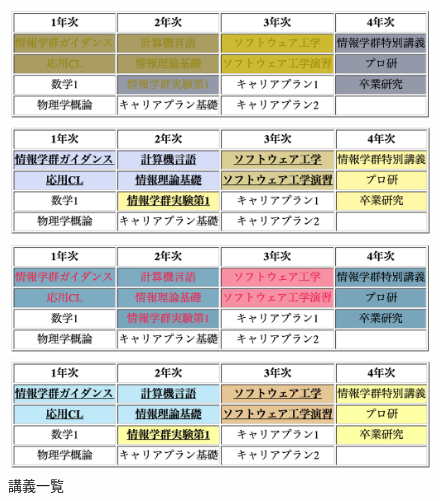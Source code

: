 \begin{figure}[H]
\begin{minipage}[b]{.49\columnwidth}
    \end{minipage}
    \begin{minipage}[b]{.49\columnwidth}
        \centering
        \includegraphics[keepaspectratio,width=\textwidth]{../../10_UniversalDesign/no1_table_OC_D.png}
    \end{minipage}
    \begin{minipage}[b]{.49\columnwidth}
        \centering
        \includegraphics[keepaspectratio,width=\textwidth]{../../10_UniversalDesign/no1_table_RC_D.png}
    \end{minipage}
    \begin{minipage}[b]{.49\columnwidth}
        \centering
        \includegraphics[keepaspectratio,width=\textwidth]{../../10_UniversalDesign/no1_table_OC_T.png}
    \end{minipage}
    \begin{minipage}[b]{.49\columnwidth}
        \centering
        \includegraphics[keepaspectratio,width=\textwidth]{../../10_UniversalDesign/no1_table_RC_T.png}
    \end{minipage}
    \caption{講義一覧}
\end{figure}
